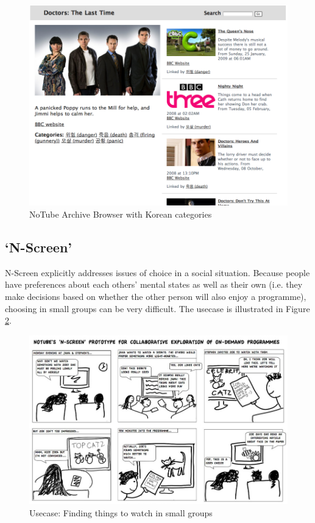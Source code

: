 \documentclass{notube}
\begin{document}
\begin{figure}[htbp]
\begin{center}
\includegraphics[width=5in]{images/korlex.png}
\caption{NoTube Archive Browser with Korean categories} \label{fig:korlex}
\end{center}
\end{figure} 

\subsection{`N-Screen'}

N-Screen explicitly addresses issues of choice in a social situation. Because people have preferences about each others' mental states as well as their own (i.e. they make decisions based on whether the other person will also enjoy a programme), choosing in small groups can be very difficult. The usecase is illustrated in Figure \ref{fig:nscreen_usecase}.

\begin{figure}[htbp]
\begin{center}
\includegraphics[width=5in]{images/nscreen_usecase.jpg}
\caption{Usecase: Finding things to watch in small groups} \label{fig:nscreen_usecase}
\end{center}
\end{figure} 
\end{document}
